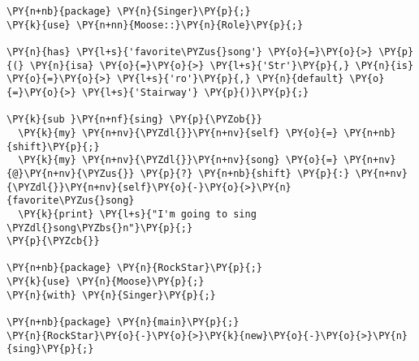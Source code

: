 \begin{Verbatim}[commandchars=\\\{\}]
\PY{n+nb}{package} \PY{n}{Singer}\PY{p}{;}
\PY{k}{use} \PY{n+nn}{Moose::}\PY{n}{Role}\PY{p}{;}

\PY{n}{has} \PY{l+s}{'favorite\PYZus{}song'} \PY{o}{=}\PY{o}{>} \PY{p}{(} \PY{n}{isa} \PY{o}{=}\PY{o}{>} \PY{l+s}{'Str'}\PY{p}{,} \PY{n}{is} \PY{o}{=}\PY{o}{>} \PY{l+s}{'ro'}\PY{p}{,} \PY{n}{default} \PY{o}{=}\PY{o}{>} \PY{l+s}{'Stairway'} \PY{p}{)}\PY{p}{;}

\PY{k}{sub }\PY{n+nf}{sing} \PY{p}{\PYZob{}}
  \PY{k}{my} \PY{n+nv}{\PYZdl{}}\PY{n+nv}{self} \PY{o}{=} \PY{n+nb}{shift}\PY{p}{;}
  \PY{k}{my} \PY{n+nv}{\PYZdl{}}\PY{n+nv}{song} \PY{o}{=} \PY{n+nv}{@}\PY{n+nv}{\PYZus{}} \PY{p}{?} \PY{n+nb}{shift} \PY{p}{:} \PY{n+nv}{\PYZdl{}}\PY{n+nv}{self}\PY{o}{-}\PY{o}{>}\PY{n}{favorite\PYZus{}song}
  \PY{k}{print} \PY{l+s}{"I'm going to sing \PYZdl{}song\PYZbs{}n"}\PY{p}{;}
\PY{p}{\PYZcb{}}

\PY{n+nb}{package} \PY{n}{RockStar}\PY{p}{;}
\PY{k}{use} \PY{n}{Moose}\PY{p}{;}
\PY{n}{with} \PY{n}{Singer}\PY{p}{;}

\PY{n+nb}{package} \PY{n}{main}\PY{p}{;}
\PY{n}{RockStar}\PY{o}{-}\PY{o}{>}\PY{k}{new}\PY{o}{-}\PY{o}{>}\PY{n}{sing}\PY{p}{;}
\end{Verbatim}
